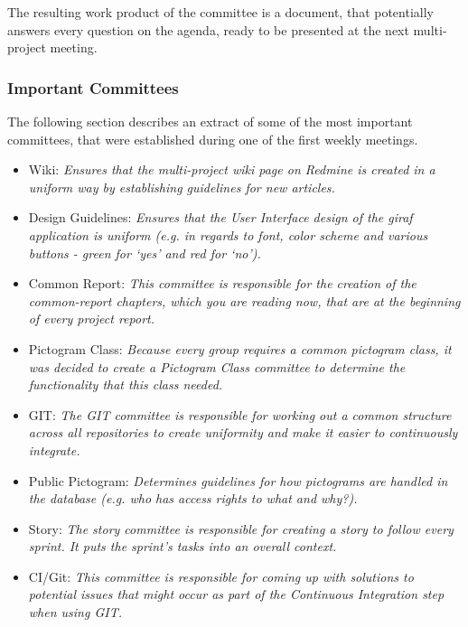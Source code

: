 The resulting work product of the committee is a document, that potentially answers every question on the agenda, ready to be presented at the next multi-project meeting.

\subsubsection*{Important Committees}
\label{subsub:importantcommittees}
The following section describes an extract of some of the most important committees, that were established during one of the first weekly meetings.

\begin{itemize}
        \item Wiki: \emph{Ensures that the multi-project wiki page on Redmine is created in a uniform way by establishing guidelines for new
        articles.}
        \item Design Guidelines: \emph{Ensures that the User Interface design of the \ac{giraf} application is uniform (e.g. in regards to font, color scheme and various buttons - green for `yes' and red for `no').}
        \item Common Report: \emph{This committee is responsible for the creation of the common-report chapters, which you are reading now, that are at the beginning of every project report.}
        \item Pictogram Class: \emph{Because every group requires a common pictogram class, it was decided to create a Pictogram Class committee to determine the functionality that this class needed.}
        \item GIT: \emph{The GIT committee is responsible for working out a common structure across all repositories to create uniformity and make it easier to continuously integrate.}
        \item Public Pictogram: \emph{Determines guidelines for how pictograms are handled in the database (e.g. who has access rights to what and why?).}
        \item Story: \emph{The story committee is responsible for creating a story to follow every sprint. It puts the sprint's tasks into an overall context.}
        \item CI/Git: \emph{This committee is responsible for coming up with solutions to potential issues that might occur as part of the Continuous Integration step when using GIT.}
\end{itemize}
